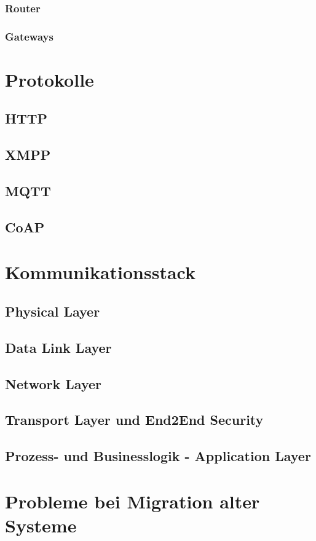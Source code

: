 \subsubsection{Router}
\subsubsection{Gateways}

\section{Protokolle}
\subsection{HTTP}
\subsection{XMPP}
\subsection{MQTT}
\subsection{CoAP}

\section{Kommunikationsstack}
\subsection{Physical Layer}
\subsection{Data Link Layer}
\subsection{Network Layer}
\subsection{Transport Layer und End2End Security}
\subsection{Prozess- und Businesslogik - Application Layer}

\section{Probleme bei Migration alter Systeme}
